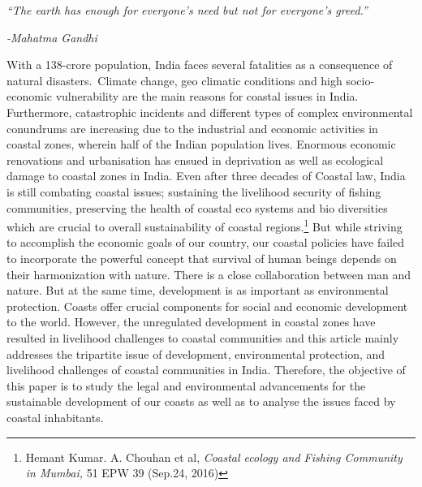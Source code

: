 \setcounter{figure}{0}
\setcounter{table}{0}
\setcounter{footnote}{0}


\label{2020-art3}

\begin{multicols}{2}

\noi
\textit{“The earth has enough for everyone’s need but not for everyone’s greed.”}
 
\vspace{-.3cm} 
 
{\hfill\textit{-Mahatma Gandhi}}

\vspace{-.3cm}  
 

\noi
With a 138-crore population, India faces several fatalities as a consequence of natural
disasters.~Climate change, geo climatic conditions and high socio-economic vulnerability are
the main reasons for coastal issues in India. Furthermore, catastrophic incidents and different
types of complex environmental conundrums are increasing due to the industrial and
economic activities in coastal zones, wherein half of the Indian population lives. Enormous
economic renovations and urbanisation has ensued in deprivation as well as ecological
damage to coastal zones in India. Even after three decades of Coastal law, India is still
combating coastal issues; sustaining the livelihood security of fishing communities,
preserving the health of coastal eco systems and bio diversities which are crucial to overall
sustainability of coastal regions.\footnote{Hemant Kumar. A. Chouhan et al, \textit{Coastal ecology and Fishing Community in Mumbai,} 51 EPW 39 (Sep.24,
2016) } But while striving to accomplish the economic goals of our
country, our coastal policies have failed to incorporate the powerful concept that survival of
human beings depends on their harmonization with nature. There is a close collaboration
between man and nature. But at the same time, development is as important as environmental
protection. Coasts offer crucial components for social and economic development to the
world. However, the unregulated development in coastal zones have resulted in livelihood
challenges to coastal communities and this article mainly addresses the tripartite issue of
development, environmental protection, and livelihood challenges of coastal communities in
India. Therefore, the objective of this paper is to study the legal and environmental
advancements for the sustainable development of our coasts as well as to analyse the issues
faced by coastal inhabitants.


\end{multicols}
